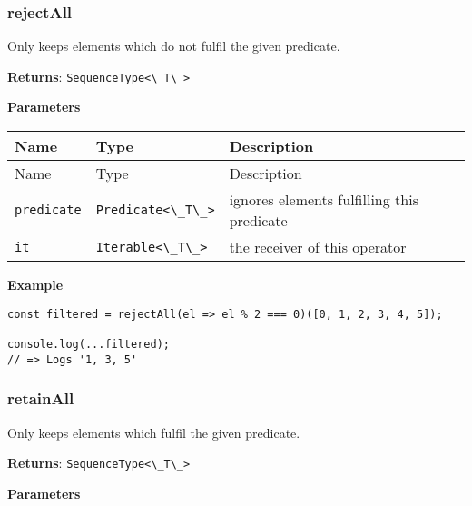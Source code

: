 \hypertarget{fa673517-e861-4391-b582-0decb366cb72}{%
\subsubsection{rejectAll}\label{fa673517-e861-4391-b582-0decb366cb72}}

Only keeps elements which do not fulfil the given predicate.

\textbf{Returns}: \passthrough{\lstinline!SequenceType<\_T\_>!}

\textbf{Parameters}

\begin{longtable}[]{
  >{\raggedright\arraybackslash}p{}
  >{\raggedright\arraybackslash}p{}
  >{\raggedright\arraybackslash}p{}@{}}

\toprule\noalign{}
Name & Type & Description \\
\midrule\noalign{}
\endfirsthead
\toprule\noalign{}
Name & Type & Description \\
\midrule\noalign{}
\endhead
\bottomrule\noalign{}
\endlastfoot
\passthrough{\lstinline!predicate!} &
\passthrough{\lstinline!Predicate<\_T\_>!} & ignores elements fulfilling
this predicate \\
\passthrough{\lstinline!it!} & \passthrough{\lstinline!Iterable<\_T\_>!}
& the receiver of this operator \\
\end{longtable}

\textbf{Example}

\begin{lstlisting}[label=a0a61f28-ccde-43a7-b440-9cfb64243aaf]
const filtered = rejectAll(el => el % 2 === 0)([0, 1, 2, 3, 4, 5]);

console.log(...filtered);
// => Logs '1, 3, 5'
\end{lstlisting}

\hypertarget{cfd0f69c-c3d5-4e1b-90f6-c7f1dd9d258e}{%
\subsubsection{retainAll}\label{cfd0f69c-c3d5-4e1b-90f6-c7f1dd9d258e}}

Only keeps elements which fulfil the given predicate.

\textbf{Returns}: \passthrough{\lstinline!SequenceType<\_T\_>!}

\textbf{Parameters}

